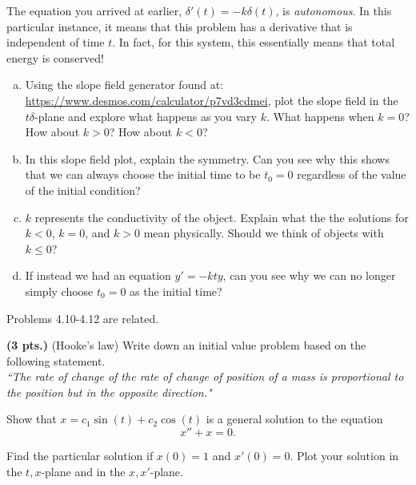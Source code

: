 \begin{problem}
    The equation you arrived at earlier, $\delta'(t) = -k\delta(t)$, is \emph{autonomous}.  In this particular instance, it means that this problem has a derivative that is independent of time $t$.  In fact, for this system, this essentially means that total energy is conserved!
    \begin{enumerate}[(a)]
        \item Using the slope field generator found at: \url{https://www.desmos.com/calculator/p7vd3cdmei}, plot the slope field in the $t\delta$-plane and explore what happens as you vary $k$. What happens when $k=0$? How about $k>0$? How about $k<0$?
        \item In this slope field plot, explain the symmetry.  Can you see why this shows that we can always choose the initial time to be $t_0=0$ regardless of the value of the initial condition?
        \item $k$ represents the conductivity of the object.  Explain what the the solutions for $k<0$, $k=0$, and $k>0$ mean physically. Should we think of objects with $k\leq 0$?
        \item If instead we had an equation $y'=-kty$, can you see why we can no longer simply choose $t_0=0$ as the initial time?
    \end{enumerate}
\end{problem}

\begin{center}
    Problems 4.10-4.12 are related.
\end{center}

\begin{problem}
	\textbf{(3 pts.)} (Hooke's law) Write down an initial value problem based on the following statement.\\
	\emph{``The rate of change of the rate of change of position of a mass is proportional to the position but in the opposite direction."}
\end{problem}

\begin{problem}
    Show that $x=c_1\sin(t)+c_2\cos(t)$ is a general solution to the equation
    \[
        x''+x=0.
    \]
\end{problem}

\begin{problem}
    Find the particular solution if $x(0)=1$ and $x'(0)=0$. Plot your solution in the $t,x$-plane and in the $x,x'$-plane.
\end{problem}



